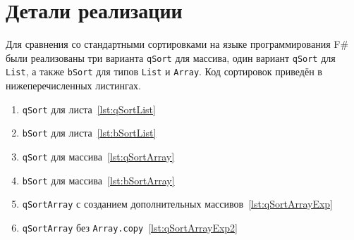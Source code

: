 \section{Детали реализации}

Для сравнения со стандартными сортировками на языке программирования F\# были реализованы три варианта \verb|qSort| для массива, один вариант \verb|qSort| для \verb|List|, а также \verb|bSort| для типов \verb|List| и \verb|Array|. 
Код сортировок приведён в нижеперечисленных листингах.
\begin{enumerate}
  \item \verb|qSort| для листа~\ref{lst:qSortList} 
  \item \verb|bSort| для листа~\ref{lst:bSortList}
  \item \verb|qSort| для массива~\ref{lst:qSortArray}
  \item \verb|bSort| для массива~\ref{lst:bSortArray} 
  \item \verb|qSortArray| с созданием дополнительных массивов~\ref{lst:qSortArrayExp}
  \item \verb|qSortArray| без \verb|Array.copy|~\ref{lst:qSortArrayExp2}
\end{enumerate}

